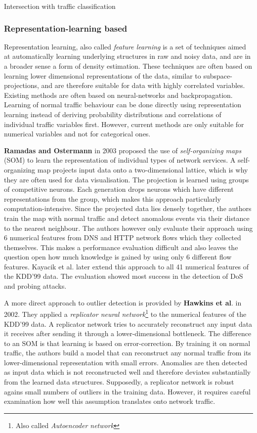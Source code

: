 \documentclass[a4paper,12pt,twoside]{report}
\begin{document}
Intersection with traffic classification


\subsubsection{Representation-learning based}

Representation learning, also called \textit{feature learning} is a set of techniques aimed at automatically learning underlying structures in raw and noisy data, and are in a broader sense a form of density estimation. These techniques are often based on learning lower dimensional representations of the data, similar to subspace-projections, and are therefore suitable for data with highly correlated variables. Existing methods are often based on neural-networks and backpropagation. Learning of normal traffic behaviour can be done directly using representation learning instead of deriving probability distributions and correlations of individual traffic variables first. However, current methods are only suitable for numerical variables and not for categorical ones.

\textbf{Ramadas and Ostermann} \cite{ramadas2003detecting} in 2003 proposed the use of \textit{self-organizing maps} (SOM) to learn the representation of individual types of network services. A self-organizing map projects input data onto a two-dimensional lattice, which is why they are often used for data visualisation. The projection is learned using groups of competitive neurons. Each generation drops neurons which have different representations from the group, which makes this approach particularly computation-intensive. Since the projected data lies densely together, the authors train the map with normal traffic and detect anomalous events via their distance to the nearest neighbour. The authors however only evaluate their approach using 6 numerical features from DNS and HTTP network flows which they collected themselves. This makes a performance evaluation difficult and also leaves the question open how much knowledge is gained by using only 6 different flow features. Kayacik et al. \cite{kayacik2007hierarchical} later extend this approach to all 41 numerical features of the KDD'99 data. The evaluation showed most success in the detection of DoS and probing attacks.

A more direct approach to outlier detection is provided by \textbf{Hawkins et al}. \cite{hawkins_outlier_2002} in 2002. They applied a \textit{replicator neural network}\footnote{Also called \textit{Autoencoder network}} to the numerical features of the KDD'99 data. A replicator network tries to accurately reconstruct any input data it receives after sending it through a lower-dimensional bottleneck. The difference to an SOM is that learning is based on error-correction. By training it on normal traffic, the authors build a model that can reconstruct any normal traffic from its lower-dimensional representation with small errors. Anomalies are then detected as input data which is not reconstructed well and therefore deviates substantially from the learned data structures. Supposedly, a replicator network is robust agains small numbers of outliers in the training data. However, it requires careful examination how well this assumption translates onto network traffic. 
\end{document}
